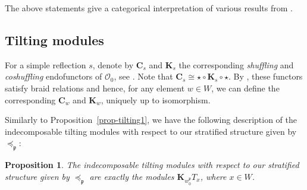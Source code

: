 \documentclass[a4paper]{amsart}
\newtheorem{proposition}[theorem]{Proposition}
\begin{document}
The above statements give a categorical interpretation of 
various results from \cite{GH07,BMS}.

\subsection{Tilting modules}\label{s4.6}

For a simple reflection $s$, denote by $\mathbf{C}_s$
and $\mathbf{K}_s$ the corresponding {\em shuffling}
and {\em coshuffling} endofunctors of $\mathcal{O}_0$,
see \cite{MS2}. Note that 
$\mathbf{C}_s\cong\star\circ\mathbf{K}_s\circ\star$.
By \cite[Proposition~7.1]{J-Z}, these functors satisfy
braid relations and hence, for any element $w\in W$, we can define
the corresponding $\mathbf{C}_w$ and $\mathbf{K}_w$,
uniquely up to isomorphism.

Similarly to Proposition~\ref{prop-tilting1},
we have the following description of the indecomposable
tilting modules with respect to our 
stratified structure given by $\preceq_\mathfrak{p}$:

\begin{proposition}\label{prop-tilting2}
The indecomposable tilting modules with respect to our
stratified structure  given by $\preceq_\mathfrak{p}$ 
are exactly the modules  $\mathbf{K}_{w_0^\mathfrak{p}}T_x$,
where $x\in W$.
\end{proposition}
\end{document}

